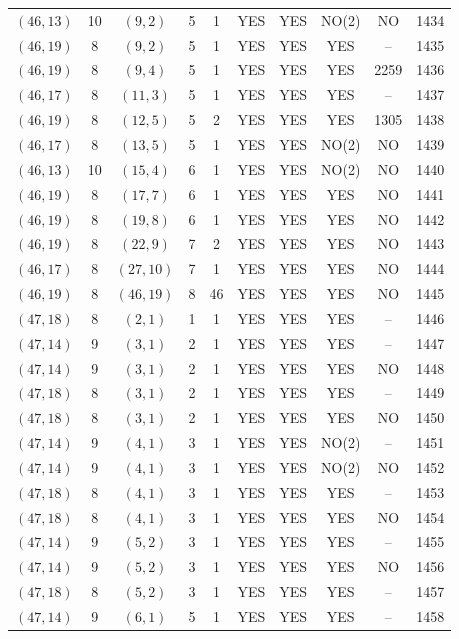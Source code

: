 \begin{longtable}{|c|c|c|c|c|c|c|c|c|c|}
$(46, 13)$ & 10 & $(9, 2)$ & 5 & 1 & YES & YES & NO(2) & NO & 1434\\
$(46, 19)$ & 8 & $(9, 2)$ & 5 & 1 & YES & YES & YES & -- & 1435\\
$(46, 19)$ & 8 & $(9, 4)$ & 5 & 1 & YES & YES & YES & 2259 & 1436\\
$(46, 17)$ & 8 & $(11, 3)$ & 5 & 1 & YES & YES & YES & -- & 1437\\
$(46, 19)$ & 8 & $(12, 5)$ & 5 & 2 & YES & YES & YES & 1305 & 1438\\
$(46, 17)$ & 8 & $(13, 5)$ & 5 & 1 & YES & YES & NO(2) & NO & 1439\\
$(46, 13)$ & 10 & $(15, 4)$ & 6 & 1 & YES & YES & NO(2) & NO & 1440\\
$(46, 19)$ & 8 & $(17, 7)$ & 6 & 1 & YES & YES & YES & NO & 1441\\
$(46, 19)$ & 8 & $(19, 8)$ & 6 & 1 & YES & YES & YES & NO & 1442\\
$(46, 19)$ & 8 & $(22, 9)$ & 7 & 2 & YES & YES & YES & NO & 1443\\
$(46, 17)$ & 8 & $(27, 10)$ & 7 & 1 & YES & YES & YES & NO & 1444\\
$(46, 19)$ & 8 & $(46, 19)$ & 8 & 46 & YES & YES & YES & NO & 1445\\
$(47, 18)$ & 8 & $(2, 1)$ & 1 & 1 & YES & YES & YES & -- & 1446\\
$(47, 14)$ & 9 & $(3, 1)$ & 2 & 1 & YES & YES & YES & -- & 1447\\
$(47, 14)$ & 9 & $(3, 1)$ & 2 & 1 & YES & YES & YES & NO & 1448\\
$(47, 18)$ & 8 & $(3, 1)$ & 2 & 1 & YES & YES & YES & -- & 1449\\
$(47, 18)$ & 8 & $(3, 1)$ & 2 & 1 & YES & YES & YES & NO & 1450\\
$(47, 14)$ & 9 & $(4, 1)$ & 3 & 1 & YES & YES & NO(2) & -- & 1451\\
$(47, 14)$ & 9 & $(4, 1)$ & 3 & 1 & YES & YES & NO(2) & NO & 1452\\
$(47, 18)$ & 8 & $(4, 1)$ & 3 & 1 & YES & YES & YES & -- & 1453\\
$(47, 18)$ & 8 & $(4, 1)$ & 3 & 1 & YES & YES & YES & NO & 1454\\
$(47, 14)$ & 9 & $(5, 2)$ & 3 & 1 & YES & YES & YES & -- & 1455\\
$(47, 14)$ & 9 & $(5, 2)$ & 3 & 1 & YES & YES & YES & NO & 1456\\
$(47, 18)$ & 8 & $(5, 2)$ & 3 & 1 & YES & YES & YES & -- & 1457\\
$(47, 14)$ & 9 & $(6, 1)$ & 5 & 1 & YES & YES & YES & -- & 1458\\

\end{longtable}
